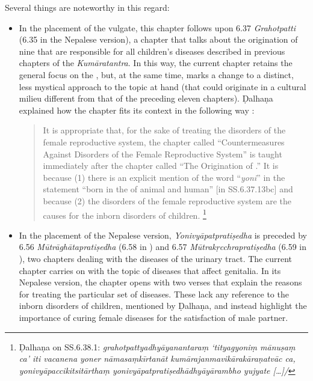 Several things are noteworthy in this regard:
\begin{itemize}
    \item In the placement of the vulgate, this chapter follows upon 6.37 
    \emph{Grahotpatti} (6.35 in the Nepalese version), a chapter that talks about the 
    origination of nine  that are responsible for all children's 
    diseases described in previous chapters of the \emph{Kumāratantra}. In this way, 
    the 
    current chapter retains the general focus on the , 
    but, at the same time, marks a change to a distinct, less mystical approach to the 
    topic at hand (that could originate in a cultural milieu different from that of the 
    preceding eleven chapters). Ḍalhaṇa explained how the chapter fits its context in the 
    following way \parencite[668b]{vulgate}: 
    \begin{quote}
        It is appropriate that, for the sake of treating the disorders 
        of the female reproductive system, the chapter called 
        “Countermeasures Against Disorders of the 
        Female Reproductive System” is taught immediately after the 
        chapter called “The Origination of .”  It 
        is because (1) there is an explicit mention of the word “\emph{yoni}” in the 
        statement  “born in the  of animal and human” [in 
        SS.6.37.13bc] and because (2) the disorders of the female 
        reproductive system are the causes for the inborn disorders of children.%
        \footnote{%
            Ḍalhaṇa on SS.6.38.1: \emph{grahotpattyadhyāyanantaraṃ ‘tityagyoniṃ 
            mānuṣaṃ ca’ iti vacanena yoner nāmasaṃkīrtanāt 
            kumārajanmavikārakāraṇatvāc ca, yonivyāpaccikitsitārthaṃ 
            yonivyāpatpratiṣedhādhyāyārambho yujyate [\ldots]/}%
            }
        \end{quote}
        
        \item In the placement of the Nepalese version, \emph{Yonivyāpatpratiṣedha} is
        preceded by 6.56 \emph{Mūtrāghātapratiṣedha} (6.58 in \cite{vulgate}) and 6.57
        \emph{Mūtrakṛcchrapratiṣedha} (6.59 in \cite{vulgate}), two chapters dealing with
        the diseases of the urinary tract.  The current chapter carries on with the topic
        of diseases that affect genitalia. In its Nepalese version, the chapter opens with
        two verses that explain the reasons for treating the particular set of diseases.
        These lack any reference to the inborn disorders of children, mentioned by
        Ḍalhaṇa, and instead highlight the importance of curing female diseases for the
        satisfaction of male partner. 
        

\end{itemize}
